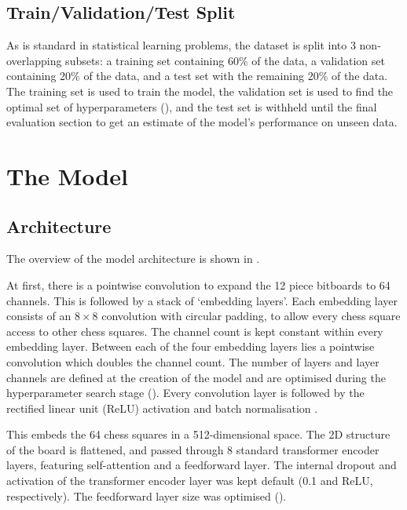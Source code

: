 \subsection{Train/Validation/Test Split}\label{mlS12}

As is standard in statistical learning problems, the dataset is split into 3
non-overlapping subsets: a training set containing 60\% of the data, a
validation set containing 20\% of the data, and a test set with the remaining
20\% of the data. The training set is used to train the model, the validation
set is used to find the optimal set of hyperparameters (), and the
test set is withheld until the final evaluation section to get an estimate of
the model's performance on unseen data. 

\section{The Model}\label{mlS2}

\subsection{Architecture}\label{mlS21}

The overview of the model architecture is shown in . 

At first, there is a pointwise convolution to expand the 12 piece bitboards to
64 channels. This is followed by a stack of `embedding layers'. Each embedding
layer consists of an $8\times8$ convolution with circular padding, to allow
every chess square access to other chess squares. The channel count is kept
constant within every embedding layer. Between each of the four embedding
layers lies a pointwise convolution which doubles the channel count. The number
of layers and layer channels are defined at the creation of the model and are
optimised during the hyperparameter search stage (). Every
convolution layer is followed by the rectified linear unit (ReLU) activation
and batch normalisation \citep{ioffe2015batch}.

This embeds the 64 chess squares in a 512-dimensional space. The 2D structure
of the board is flattened, and passed through 8 standard transformer encoder
\citep{attention} layers, featuring self-attention and a feedforward layer. The
internal dropout and activation of the transformer encoder layer was kept
default (0.1 and ReLU, respectively). The feedforward layer size was optimised
().

